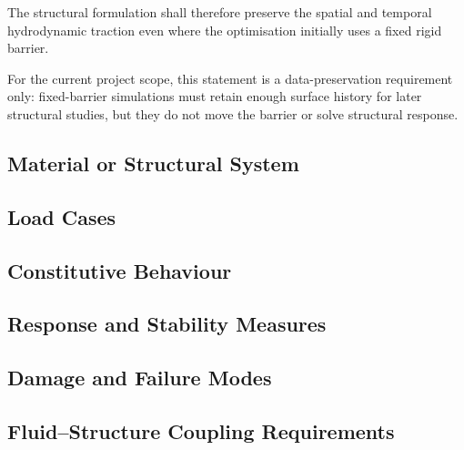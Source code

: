 The structural formulation shall therefore preserve the spatial and
temporal hydrodynamic traction even where the optimisation initially
uses a fixed rigid barrier.

For the current project scope, this statement is a data-preservation
requirement only: fixed-barrier simulations must retain enough surface
history for later structural studies, but they do not move the barrier
or solve structural response.

\subsection{Material or Structural System}
\label{sec:res-str-fsi-material-structural-system}


\subsection{Load Cases}
\label{sec:res-str-fsi-load-cases}


\subsection{Constitutive Behaviour}
\label{sec:res-str-fsi-constitutive-behaviour}


\subsection{Response and Stability Measures}
\label{sec:res-str-fsi-response-stability-measures}


\subsection{Damage and Failure Modes}
\label{sec:res-str-fsi-damage-failure-modes}


\subsection{Fluid--Structure Coupling Requirements}
\label{sec:res-str-fsi-fluid-structure-coupling-requirements}


